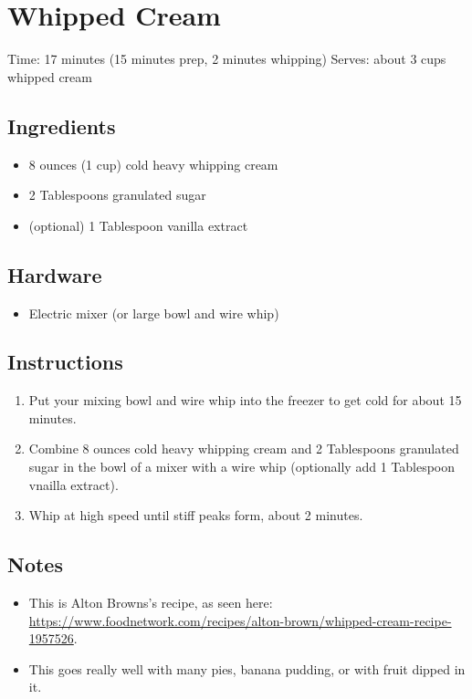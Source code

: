 \section{Whipped Cream}
\label{whippedCream}
\setcounter{secnumdepth}{0}
Time: 17 minutes (15 minutes prep, 2 minutes whipping)
Serves: about 3 cups whipped cream

\begin{multicols}{2}
\subsection*{Ingredients}
\begin{itemize}
    \item 8 ounces (1 cup) cold heavy whipping cream
    \item 2 Tablespoons granulated sugar
    \item (optional) 1 Tablespoon vanilla extract
\end{itemize}

\subsection*{Hardware}
\begin{itemize}
    \item Electric mixer (or large bowl and wire whip)
\end{itemize}
\clearpage

\subsection*{Instructions}
\begin{enumerate}
    \item Put your mixing bowl and wire whip into the freezer to get cold for about 15 minutes.
    \item Combine 8 ounces cold heavy whipping cream and 2 Tablespoons granulated sugar in the bowl of a mixer with a wire whip (optionally add 1 Tablespoon vnailla extract).
    \item Whip at high speed until stiff peaks form, about 2 minutes.
\end{enumerate}

\subsection*{Notes}
\begin{itemize}
    \item This is Alton Browns's recipe, as seen here: \url{https://www.foodnetwork.com/recipes/alton-brown/whipped-cream-recipe-1957526}.
    \item This goes really well with many pies, banana pudding, or with fruit dipped in it.
\end{itemize}
\end{multicols}
\clearpage